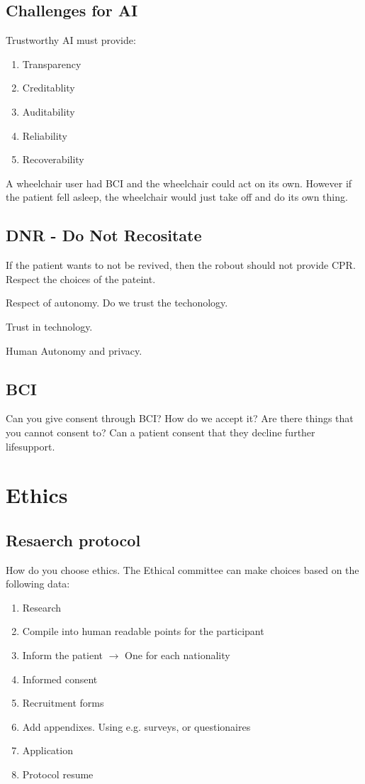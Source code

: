 \documentclass[a4paper]{article}
\begin{document}
\subsection{Challenges for AI}
Trustworthy AI must provide:
\begin{enumerate}
	\item Transparency
	\item Creditablity
	\item Auditability
	\item Reliability
	\item Recoverability
\end{enumerate}

A wheelchair user had BCI and the wheelchair could act on its own. However if the patient fell asleep, the wheelchair would just take off and do its own thing.


\subsection{DNR - Do Not Recositate}
If the patient wants to not be revived, then the robout should not provide CPR. Respect the choices of the pateint.

Respect of autonomy. Do we trust the techonology.

Trust in technology. 

Human Autonomy and privacy.


\subsection{BCI}
Can you give consent through BCI? How do we accept it? Are there things that you cannot consent to? Can a patient consent that they decline further lifesupport.

\section{Ethics}
\subsection{Resaerch protocol}
How do you choose ethics. The Ethical committee can make choices based on the following data:
\begin{enumerate}
	\item Research
	\item Compile into human readable points for the participant
	\item Inform the patient $ \rightarrow $ One for each nationality
	\item Informed consent 
	\item Recruitment forms
	\item Add appendixes. Using e.g. surveys, or questionaires
	\item Application
	\item Protocol resume
\end{enumerate}
\end{document}
